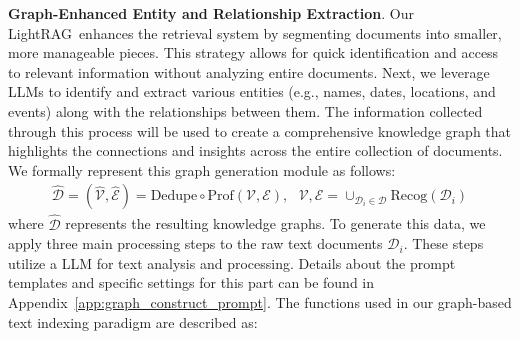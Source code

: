 \documentclass{article} %
\def\model{LightRAG}
\begin{document}
\textbf{Graph-Enhanced Entity and Relationship Extraction}. Our \model\ enhances the retrieval system by segmenting documents into smaller, more manageable pieces. This strategy allows for quick identification and access to relevant information without analyzing entire documents. Next, we leverage LLMs to identify and extract various entities (e.g., names, dates, locations, and events) along with the relationships between them. The information collected through this process will be used to create a comprehensive knowledge graph that highlights the connections and insights across the entire collection of documents. We formally represent this graph generation module as follows:
\begin{align}
    \hat{\mathcal{D}} = (\hat{\mathcal{V}},\hat{\mathcal{E}}) = \text{Dedupe}\circ\text{Prof}(\mathcal{V}, \mathcal{E}),~~~\mathcal{V}, \mathcal{E} = \cup_{\mathcal{D}_i\in\mathcal{D}} \text{Recog}(\mathcal{D}_i)
\end{align}
where $\hat{\mathcal{D}}$ represents the resulting knowledge graphs. To generate this data, we apply three main processing steps to the raw text documents $\mathcal{D}_i$. These steps utilize a LLM for text analysis and processing. Details about the prompt templates and specific settings for this part can be found in Appendix~\ref{app:graph_construct_prompt}. The functions used in our graph-based text indexing paradigm are described as:
\end{document}
